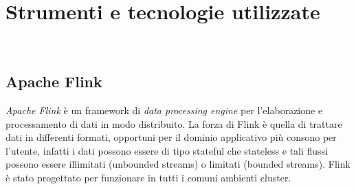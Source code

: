 
\chapter{Strumenti e tecnologie utilizzate}
\label{cap:strumenti-tecnologie}


\\

\section{Apache Flink}
\textit{Apache Flink} è un \gls{framework} di \textit{data processing engine} per l'elaborazione e processamento di dati in modo distribuito.
La forza di Flink è quella di trattare dati in differenti formati, opportuni per il dominio applicativo più consono per l'utente, infatti i dati possono essere di tipo \gls{stateful} che \gls{stateless} e tali flussi possono essere illimitati (\gls{unbounded streams}) o limitati (\gls{bounded streams}). Flink è stato progettato per funzionare in tutti i comuni ambienti \gls{cluster}.

